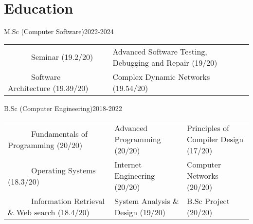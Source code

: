 \documentclass[11pt,a4paper,sans]{moderncv}
\title{}
\begin{document}
\hypersetup{
    linkcolor=blue,
    filecolor=magenta,
    urlcolor=cyan,
}
\noindent
\makecvtitle

\vspace{-0.5em}

\vspace{-0.4em}
\section{Education}

{M.Sc (Computer Software)}{2022-2024}{}{}
\small{
	\begin{tabular}
		{l@{\hskip 5mm}l@{\hskip 5mm}l}
		~~~~~~Seminar (19.2/20)   &    Advanced Software Testing, Debugging and Repair (19/20) \\
		~~~~~~Software Architecture (19.39/20)  & Complex Dynamic Networks (19.54/20) \\
	\end{tabular}
	\medskip
} %

\vspace{-0.2em}

\vspace{0.6em}

{B.Sc (Computer Engineering)}{2018-2022}{}{}
\small{
	\begin{tabular}
		{l@{\hskip 5mm}l@{\hskip 5mm}l}
		~~~~~~Fundamentals of Programming (20/20) & Advanced Programming (20/20) & Principles of Compiler Design (17/20) \\
		~~~~~~Operating Systems (18.3/20) & Internet Engineering (20/20) &  Computer Networks (20/20) \\
		~~~~~~Information Retrieval \& Web search (18.4/20) & System Analysis \& Design (19/20) & B.Sc Project (20/20)

	\end{tabular}
	\medskip
} %
\end{document}
